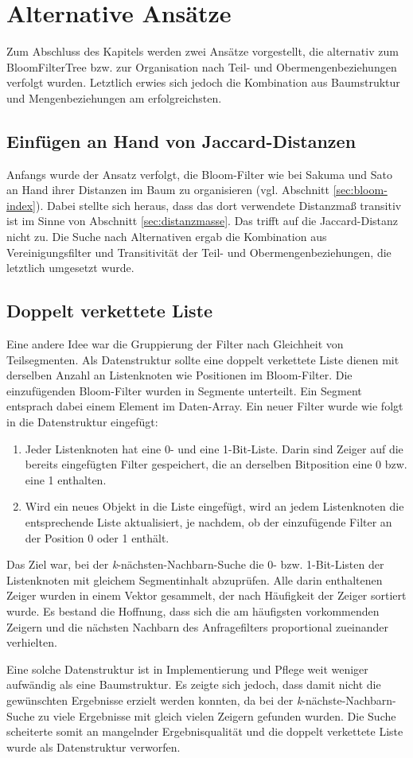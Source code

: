 \section{Alternative Ansätze}\label{sec:alternativen}
Zum Abschluss des Kapitels werden zwei Ansätze vorgestellt, die alternativ zum BloomFilterTree bzw. zur Organisation nach Teil- und Obermengenbeziehungen verfolgt wurden. Letztlich erwies sich jedoch die Kombination aus Baumstruktur und Mengenbeziehungen am erfolgreichsten. 
\subsection{Einfügen an Hand von Jaccard-Distanzen}\label{sec:ähnlichkeit}
Anfangs wurde der Ansatz verfolgt, die Bloom-Filter wie bei Sakuma und Sato an Hand ihrer Distanzen im Baum zu organisieren (vgl. Abschnitt \ref{sec:bloom-index}). Dabei stellte sich heraus, dass das dort verwendete Distanzmaß transitiv ist im Sinne von Abschnitt \ref{sec:distanzmasse}. Das trifft auf die Jaccard-Distanz nicht zu. Die Suche nach Alternativen ergab die Kombination aus Vereinigungsfilter und Transitivität der Teil- und Obermengenbeziehungen, die letztlich umgesetzt wurde. 
\subsection{Doppelt verkettete Liste}\label{sec:verkettete-liste}
Eine andere Idee war die Gruppierung der Filter nach Gleichheit von Teilsegmenten. Als Datenstruktur sollte eine doppelt verkettete Liste dienen mit derselben Anzahl an Listenknoten wie Positionen im Bloom-Filter. Die einzufügenden Bloom-Filter wurden in Segmente unterteilt. Ein Segment entsprach dabei einem Element im Daten-Array. Ein neuer Filter wurde wie folgt in die Datenstruktur eingefügt:  
\begin{enumerate}
	\item Jeder Listenknoten hat eine 0- und eine 1-Bit-Liste. Darin sind Zeiger auf die bereits eingefügten Filter gespeichert, die an derselben Bitposition eine 0 bzw. eine 1 enthalten. 
	\item Wird ein neues Objekt in die Liste eingefügt, wird an jedem Listenknoten die entsprechende Liste aktualisiert, je nachdem, ob der einzufügende Filter an der Position 0 oder 1 enthält. 
\end{enumerate}
Das Ziel war, bei der \textit{k}-nächsten-Nachbarn-Suche die 0- bzw. 1-Bit-Listen der Listenknoten mit gleichem Segmentinhalt abzuprüfen. Alle darin enthaltenen Zeiger wurden in einem Vektor gesammelt, der nach Häufigkeit der Zeiger sortiert wurde. Es bestand die Hoffnung, dass sich die am häufigsten vorkommenden Zeigern und die nächsten Nachbarn des Anfragefilters proportional zueinander verhielten.
 
Eine solche Datenstruktur ist in Implementierung und Pflege weit weniger aufwändig als eine Baumstruktur. Es zeigte sich jedoch, dass damit nicht die gewünschten Ergebnisse erzielt werden konnten, da bei der \textit{k}-nächste-Nachbarn-Suche zu viele Ergebnisse mit gleich vielen Zeigern gefunden wurden. Die Suche scheiterte somit an mangelnder Ergebnisqualität und die doppelt verkettete Liste wurde als Datenstruktur verworfen. 